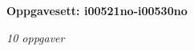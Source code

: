 \centerline{\bf Oppgavesett: i00521no-i00530no}
\vskip 10pt
\centerline{\it 10 oppgaver}\vskip 10pt
\vskip 10pt
